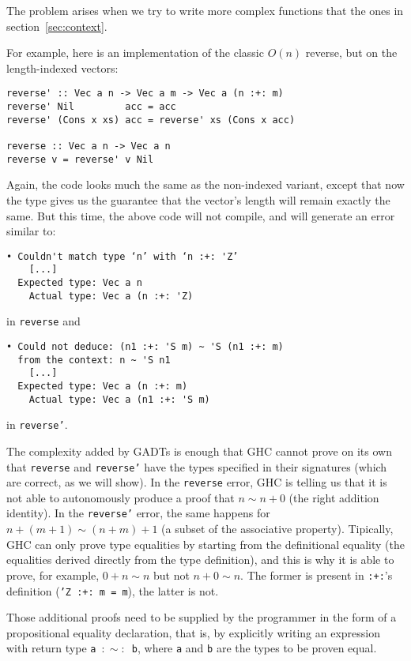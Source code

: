 The problem arises when we try to write more complex functions that the ones in section~\ref{sec:context}.

For example, here is an implementation of the classic $O(n)$ reverse, but on the length-indexed vectors:

\begin{lstlisting}
reverse' :: Vec a n -> Vec a m -> Vec a (n :+: m)
reverse' Nil         acc = acc
reverse' (Cons x xs) acc = reverse' xs (Cons x acc)

reverse :: Vec a n -> Vec a n
reverse v = reverse' v Nil
\end{lstlisting}

Again, the code looks much the same as the non-indexed variant, except that now the type gives us the guarantee that the vector's length will remain exactly the same.
But this time, the above code will not compile, and will generate an error similar to:

\begin{verbatim}
• Couldn't match type ‘n’ with ‘n :+: 'Z’
    [...]
  Expected type: Vec a n
    Actual type: Vec a (n :+: 'Z)
\end{verbatim}

in \texttt{reverse} and

\begin{verbatim}
• Could not deduce: (n1 :+: 'S m) ~ 'S (n1 :+: m)
  from the context: n ~ 'S n1
    [...]
  Expected type: Vec a (n :+: m)
    Actual type: Vec a (n1 :+: 'S m)
\end{verbatim}

in \texttt{reverse'}.

The complexity added by GADTs is enough that GHC cannot prove on its own that \texttt{reverse} and \texttt{reverse'} have the types specified in their signatures (which are correct, as we will show).
In the \texttt{reverse} error, GHC is telling us that it is not able to autonomously produce a proof that $n \sim n+0$ (the right addition identity).
In the \texttt{reverse'} error, the same happens for $n+(m+1) \sim (n+m)+1$ (a subset of the associative property).
Tipically, GHC can only prove type equalities by starting from the definitional equality (the equalities derived directly from the type definition), and this is why it is able to prove, for example, $0+n \sim n$ but not $n+0 \sim n$. The former is present in \texttt{:+:}'s definition (\texttt{'Z :+: m = m}), the latter is not.

Those additional proofs need to be supplied by the programmer in the form of a propositional equality declaration, that is, by explicitly writing an expression with return type \texttt{a $:\sim:$ b}, where \texttt{a} and \texttt{b} are the types to be proven equal.

